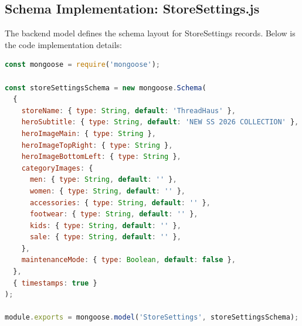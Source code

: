 \documentclass[12pt,a4paper]{report}
\begin{document}
\newpage

\subsection{Schema Implementation: StoreSettings.js}
The backend model defines the schema layout for StoreSettings records. Below is the code implementation details:
\begin{lstlisting}[language=JavaScript]
const mongoose = require('mongoose');

const storeSettingsSchema = new mongoose.Schema(
  {
    storeName: { type: String, default: 'ThreadHaus' },
    heroSubtitle: { type: String, default: 'NEW SS 2026 COLLECTION' },
    heroImageMain: { type: String },
    heroImageTopRight: { type: String },
    heroImageBottomLeft: { type: String },
    categoryImages: {
      men: { type: String, default: '' },
      women: { type: String, default: '' },
      accessories: { type: String, default: '' },
      footwear: { type: String, default: '' },
      kids: { type: String, default: '' },
      sale: { type: String, default: '' },
    },
    maintenanceMode: { type: Boolean, default: false },
  },
  { timestamps: true }
);

module.exports = mongoose.model('StoreSettings', storeSettingsSchema);

\end{lstlisting}
\newpage
\end{document}
